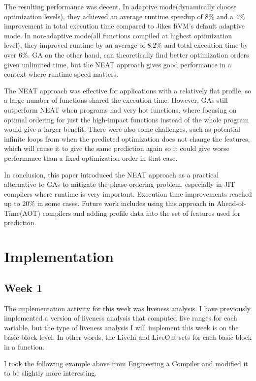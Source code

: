 \documentclass[11pt, a4paper, titlepage]{article}
\begin{document}
The resulting performance was decent. In adaptive mode(dynamically choose optimization levels), they achieved an average runtime speedup of $8\%$ and a $4\%$ improvement in total execution time compared to Jikes RVM's default adaptive mode. In non-adaptive mode(all functions compiled at highest optimization level), they improved runtime by an average of $8.2\%$ and total execution time by over $6\%$.
GA on the other hand, can theoretically find better optimization orders given unlimited time, but the NEAT approach gives good performance in a context where runtime speed matters.

The NEAT approach was effective for applications with a relatively flat profile, so a large number of functions shared the execution time. However, GAs still outperform NEAT when programs had very hot functions, where focusing on optimal ordering for just the high-impact functions instead of the whole program would give a larger benefit. There were also some challenges, such as potential infinite loops from when the predicted optimization does not change the features, which will cause it to give the same prediction again so it could give worse performance than a fixed optimization order in that case.

In conclusion, this paper introduced the NEAT approach as a practical alternative to GAs to mitigate the phase-ordering problem, especially in JIT compilers where runtime is very important. Execution time improvements reached up to $20\%$ in some cases.
Future work includes using this approach in Ahead-of-Time(AOT) compilers and adding profile data into the set of features used for prediction.

\pagebreak
\section{Implementation}

\subsection{Week 1}

The implementation activity for this week was liveness analysis.
I have previously implemented a version of liveness analysis that computed live ranges for each variable,
but the type of liveness analysis I will implement this week is on the basic-block level.
In other words, the LiveIn and LiveOut sets for each basic block in a function.

I took the following example above from Engineering a Compiler and modified it to be slightly more interesting.
\end{document}
